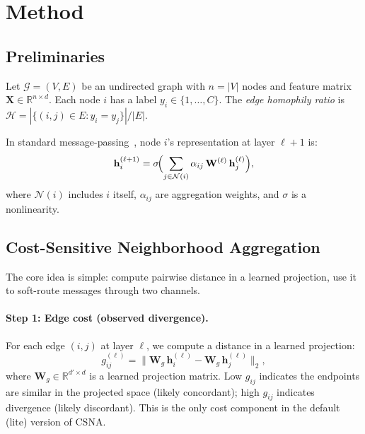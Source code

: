 \documentclass[runningheads]{llncs}
\newcommand{\R}{\mathbb{R}}
\newcommand{\N}{\mathcal{N}}
\newcommand{\G}{\mathcal{G}}
\newcommand{\bW}{\mathbf{W}}
\newcommand{\bh}{\mathbf{h}}
\begin{document}
\section{Method}\label{sec:method}

\subsection{Preliminaries}

Let $\G = (V, E)$ be an undirected graph with $n = |V|$ nodes and feature matrix $\mathbf{X} \in \R^{n \times d}$.
Each node $i$ has a label $y_i \in \{1, \ldots, C\}$.
The \emph{edge homophily ratio} is $\mathcal{H} = |\{(i,j) \in E : y_i = y_j\}|/|E|$.

In standard message-passing~\cite{gilmer2017neural}, node $i$'s representation at layer $\ell+1$ is:
\begin{equation}\label{eq:mp}
    \bh_i^{(\ell+1)} = \sigma\!\Bigl(\sum_{j \in \N(i)} \alpha_{ij}\, \bW^{(\ell)}\, \bh_j^{(\ell)}\Bigr),
\end{equation}
where $\N(i)$ includes $i$ itself, $\alpha_{ij}$ are aggregation weights, and $\sigma$ is a nonlinearity.

\subsection{Cost-Sensitive Neighborhood Aggregation}\label{sec:csna}

The core idea is simple: compute pairwise distance in a learned projection, use it to soft-route messages through two channels.

\paragraph{Step 1: Edge cost (observed divergence).}
For each edge $(i,j)$ at layer $\ell$, we compute a distance in a learned projection:
\begin{equation}\label{eq:g}
    g_{ij}^{(\ell)} = \|\bW_g\, \bh_i^{(\ell)} - \bW_g\, \bh_j^{(\ell)}\|_2,
\end{equation}
where $\bW_g \in \R^{d' \times d}$ is a learned projection matrix.
Low $g_{ij}$ indicates the endpoints are similar in the projected space (likely concordant); high $g_{ij}$ indicates divergence (likely discordant).
This is the only cost component in the default (lite) version of CSNA.
\end{document}
